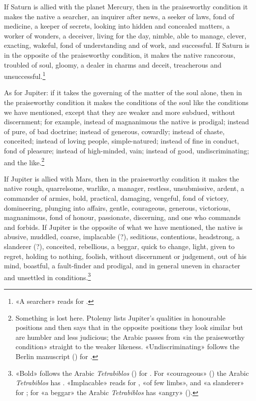 \documentclass[11pt]{article}
\newcommand{\Fol}[1]{\marginpar{\footnotesize\color{gray}f.\,#1}}
\begin{document}
\par \Fol{57v}If Saturn is allied with the planet Mercury, then in the praiseworthy condition it makes the native a searcher, an inquirer after news, a seeker of laws, fond of medicine, a keeper of secrets, looking into hidden and concealed matters, a worker of wonders, a deceiver, living for the day, nimble, able to manage, clever, exacting, wakeful, fond of understanding and of work, and successful. If Saturn is in the opposite of the praiseworthy condition, it makes the native rancorous, troubled of soul, gloomy, a dealer in charms and deceit, treacherous and unsuccessful.\footnote{«A searcher» reads  for .}\par
\par As for Jupiter: if it takes the governing of the matter of the soul alone, then in the praiseworthy condition it makes the conditions of the soul like the conditions we have mentioned, except that they are weaker and more subdued, without discernment; for example, instead of magnanimous the native is prodigal; instead of pure, of bad doctrine; instead of generous, cowardly; instead of chaste, conceited; instead of loving people, simple-natured; instead of fine in conduct, fond of pleasure; instead of high-minded, vain; instead of good, undiscriminating; and the like.\footnote{Something is lost here. Ptolemy lists Jupiter's qualities in honourable positions and then says that in the opposite positions they look similar but are humbler and less judicious; the Arabic passes from «in the praiseworthy condition» straight to the weaker likeness. «Undiscriminating» follows the Berlin manuscript () for .}\par
\par \Fol{58r}If Jupiter is allied with Mars, then in the praiseworthy condition it makes the native rough, quarrelsome, warlike, a manager, restless, unsubmissive, ardent, a commander of armies, bold, practical, damaging, vengeful, fond of victory, domineering, plunging into affairs, gentle, courageous, generous, victorious, magnanimous, fond of honour, passionate, discerning, and one who commands and forbids. If Jupiter is the opposite of what we have mentioned, the native is abusive, muddled, coarse, implacable (?), seditious, contentious, headstrong, a slanderer (?), conceited, rebellious, a beggar, quick to change, light, given to regret, holding to nothing, foolish, without discernment or judgement, out of his mind, boastful, a fault-finder and prodigal, and in general uneven in character and unsettled in conditions.\footnote{«Bold» follows the Arabic \emph{Tetrabiblos} () for . For «courageous» () the Arabic \emph{Tetrabiblos} has . «Implacable» reads  for , «of few limbs», and «a slanderer»  for ; for «a beggar» the Arabic \emph{Tetrabiblos} has «angry» ().}\par
\end{document}
